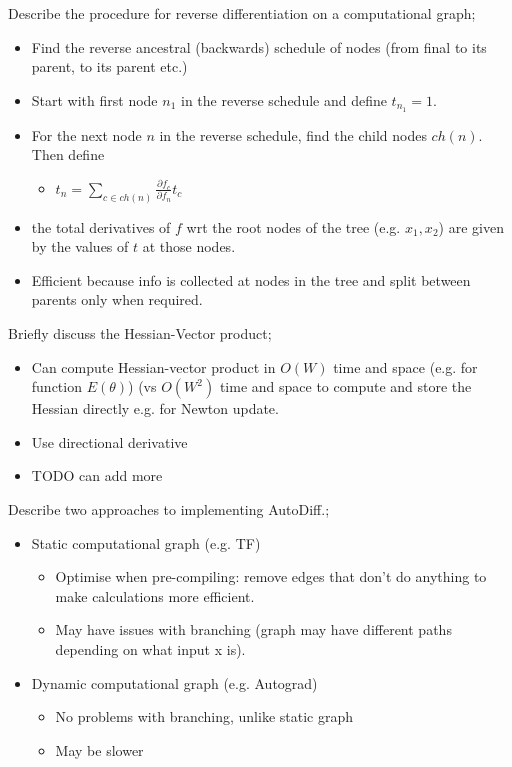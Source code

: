 \documentclass{article}
\begin{document}
Describe the procedure for reverse differentiation on a computational graph; \begin{itemize} \item Find the reverse ancestral (backwards) schedule of nodes (from final to its parent, to its parent etc.) \item Start with first node $n_1$ in the reverse schedule and define $t_{n_1}=1$.  \item For the next node $n$ in the reverse schedule, find the child nodes $ch(n)$. Then define \begin{itemize} \item $t_n = \sum_{c\in ch(n)}\frac{\partial f_c}{\partial f_n}t_c$ \end{itemize} \item the total derivatives of $f$ wrt the root nodes of the tree (e.g. $x_1, x_2$) are given by the values of $t$ at those nodes.  \item Efficient because info is collected at nodes in the tree and split between parents only when required.  \end{itemize}

Briefly discuss the Hessian-Vector product; \begin{itemize} \item Can compute Hessian-vector product in $O(W)$ time and space (e.g. for function $E(\theta)$) (vs $O(W^2)$ time and space to compute and store the Hessian directly e.g. for Newton update.  \item Use directional derivative \item TODO can add more \end{itemize}

Describe two approaches to implementing AutoDiff.; \begin{itemize} \item Static computational graph (e.g. TF) \begin{itemize} \item Optimise when pre-compiling: remove edges that don't do anything to make calculations more efficient.  \item May have issues with branching (graph may have different paths depending on what input x is).  \end{itemize} \item Dynamic computational graph (e.g. Autograd) \begin{itemize} \item No problems with branching, unlike static graph \item May be slower \end{itemize} \end{itemize} 
\end{document}
